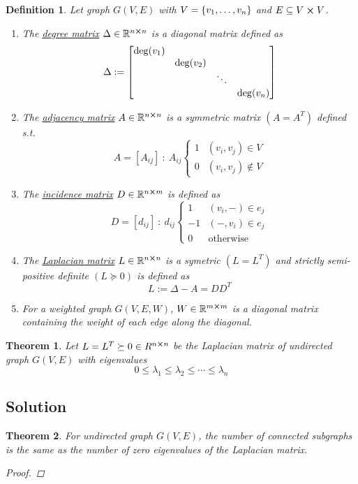\documentclass[]{article}
\numberwithin{equation}{section}
\newcommand{\R}{\mathbb{R}}
\newcommand{\st}{\ : \ }
\newtheorem{definition}{Definition}
\newtheorem{theorem}{Theorem}
\begin{document}
\newpage
\begin{definition}
	Let graph $G(V,E)$ with $V = \qty{v_1,\dots,v_n}$ and $E \subseteq V \cross V$.
	\begin{enumerate}
		\item The \underline{\emph{degree matrix}} $\Delta \in \R^{n\cross n}$ is a diagonal matrix defined as \[
			\Delta := \mqty[\dmat{\deg(v_1), \deg(v_2), \ddots, \deg(v_n)}]
		\]
		\item The \emph{\underline{adjacency matrix}} $A \in \R^{n\cross n}$ is a symmetric matrix $(A = A^T)$ defined s.t. \[
			A = [A_{ij}] \st A_{ij} \begin{cases}
				1 &(v_i,v_j) \in V\\
				0 &(v_i,v_j) \notin V
			\end{cases}
		\]
		\item The \emph{\underline{incidence matrix}} $D \in \R^{n \cross m}$ is defined as\[
			D = [d_{ij}] \st d_{ij} \begin{cases}
				1 	&(v_i,-) \in e_{j}\\
				-1	&(-,v_i) \in e_{j}\\
				0	&\text{otherwise}
			\end{cases}
		\]
		\item The \emph{\underline{Laplacian matrix}} $L \in \R^{n \cross n}$ is a symetric $(L = L^T)$ and strictly semi-positive definite $(L \succeq 0)$ is defined as\[
			L := \Delta - A = D D^T
		\]
		\item For a weighted graph $G(V,E,W)$, $W\in \R^{m\cross m}$ is a diagonal matrix containing the weight of each edge along the diagonal.
	\end{enumerate}
\end{definition}

\begin{theorem}
	Let $L = L^T \succeq 0 \in R^{n\cross n}$ be the Laplacian matrix of undirected graph $G(V,E)$ with eigenvalues \[
		0 \leq \lambda_1 \leq \lambda_2 \leq \cdots \leq \lambda_n
	\]
\end{theorem}


\subsection*{Solution}
\begin{theorem}
	For undirected graph $G(V,E)$, the number of connected subgraphs is the same as the number of zero eigenvalues of the Laplacian matrix.
	\begin{proof}
		
	\end{proof}
\end{theorem}
\end{document}
